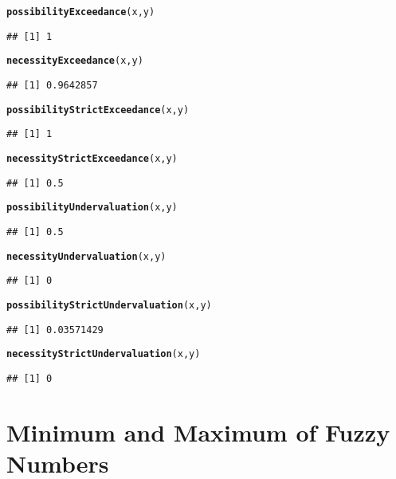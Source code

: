 \documentclass[11pt]{article}\usepackage[]{graphicx}\usepackage[]{color}
\makeatletter
\newcommand{\hlstd}[1]{\textcolor[rgb]{0.345,0.345,0.345}{#1}}%
\newcommand{\hlkwd}[1]{\textcolor[rgb]{0.737,0.353,0.396}{\textbf{#1}}}%
\newenvironment{kframe}{%
 \def\at@end@of@kframe{}%
 \ifinner\ifhmode%
  \def\at@end@of@kframe{\end{minipage}}%
  \begin{minipage}{\columnwidth}%
 \fi\fi%
 \def\FrameCommand##1{\hskip\@totalleftmargin \hskip-\fboxsep
 \colorbox{shadecolor}{##1}\hskip-\fboxsep
     \hskip-\linewidth \hskip-\@totalleftmargin \hskip\columnwidth}%
 \MakeFramed {\advance\hsize-\width
   \@totalleftmargin\z@ \linewidth\hsize
   \@setminipage}}%
 {\par\unskip\endMakeFramed%
 \at@end@of@kframe}
\newenvironment{knitrout}{}{} %
\makeatother
\begin{document}
\begin{knitrout}
\begin{kframe}\begin{alltt}
\hlkwd{possibilityExceedance}\hlstd{(x,y)}
\end{alltt}
\begin{verbatim}
## [1] 1
\end{verbatim}
\begin{alltt}
\hlkwd{necessityExceedance}\hlstd{(x,y)}
\end{alltt}
\begin{verbatim}
## [1] 0.9642857
\end{verbatim}
\begin{alltt}
\hlkwd{possibilityStrictExceedance}\hlstd{(x,y)}
\end{alltt}
\begin{verbatim}
## [1] 1
\end{verbatim}
\begin{alltt}
\hlkwd{necessityStrictExceedance}\hlstd{(x,y)}
\end{alltt}
\begin{verbatim}
## [1] 0.5
\end{verbatim}
\begin{alltt}
\hlkwd{possibilityUndervaluation}\hlstd{(x,y)}
\end{alltt}
\begin{verbatim}
## [1] 0.5
\end{verbatim}
\begin{alltt}
\hlkwd{necessityUndervaluation}\hlstd{(x,y)}
\end{alltt}
\begin{verbatim}
## [1] 0
\end{verbatim}
\begin{alltt}
\hlkwd{possibilityStrictUndervaluation}\hlstd{(x,y)}
\end{alltt}
\begin{verbatim}
## [1] 0.03571429
\end{verbatim}
\begin{alltt}
\hlkwd{necessityStrictUndervaluation}\hlstd{(x,y)}
\end{alltt}
\begin{verbatim}
## [1] 0
\end{verbatim}
\end{kframe}
\end{knitrout}

\section{Minimum and Maximum of Fuzzy Numbers}
\end{document}
